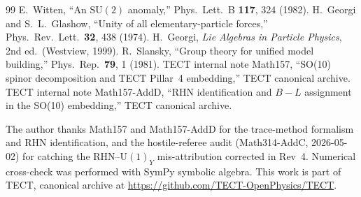 \begin{thebibliography}{99}
 E.~Witten,
  ``An $\mathrm{SU}(2)$ anomaly,''
  Phys.\ Lett.\ B \textbf{117}, 324 (1982).
 H.~Georgi and S.~L.~Glashow,
  ``Unity of all elementary-particle forces,''
  Phys.\ Rev.\ Lett.\ \textbf{32}, 438 (1974).
 H.~Georgi,
  \emph{Lie Algebras in Particle Physics}, 2nd ed.\ (Westview, 1999).
 R.~Slansky,
  ``Group theory for unified model building,''
  Phys.\ Rep.\ \textbf{79}, 1 (1981).
 TECT internal note Math157,
  ``SO(10) spinor decomposition and TECT Pillar~4 embedding,''
  TECT canonical archive.
 TECT internal note Math157-AddD,
  ``RHN identification and $B-L$ assignment in the SO(10) embedding,''
  TECT canonical archive.
\end{thebibliography}

\begin{acknowledgments}
The author thanks Math157 and Math157-AddD for the trace-method
formalism and RHN identification, and the hostile-referee audit
(Math314-AddC, 2026-05-02) for catching the RHN--$\mathrm{U}(1)_Y$
mis-attribution corrected in Rev~4. Numerical cross-check was
performed with SymPy symbolic algebra. This work is part of TECT,
canonical archive at
\url{https://github.com/TECT-OpenPhysics/TECT}.
\end{acknowledgments}


